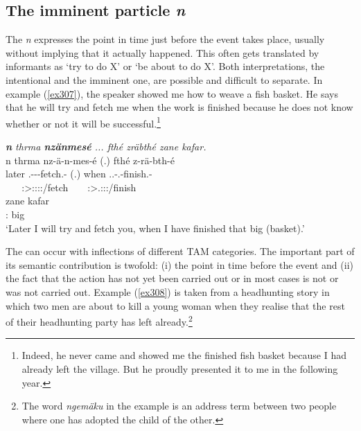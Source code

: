 \subsection{The imminent particle \emph{n}}\label{imminentm}

The   \emph{n} expresses the point in time just before the event takes place, usually without implying that it actually happened. This often gets translated by informants as `try to do X' or `be about to do X'. Both interpretations, the intentional and the imminent one, are possible and difficult to separate. In example (\ref{ex307}), the speaker showed me how to weave a fish basket. He says that he will try and fetch me when the work is finished because he does not know whether or not it will be successful.\footnote{Indeed, he never came and showed me the finished fish basket because I had already left the village. But he proudly presented it to me in the following year.}

\begin{exe}
	\ex \emph{\textbf{n} thrma \textbf{nzänmesé} ... fthé zräbthé zane kafar.}\\
	\glll n thrma nz-ä-n-mes-é (.) fthé z-rä-bth-é \\
	{\Imn} later \Ssg.\Bet-\Ndu-\Venit-fetch.\Rs-\Fsg{} (.) when \Tsg.\F.\Bet-\Irr.\Ndu-finish.\Rs-\Fsg{}\\
	~ ~ {\footnotesize \Fsg:\Sbj>\Ssg:\Obj:\Irr:\Pfv:\Venit/fetch} ~ ~ {\footnotesize \Fsg:\Sbj>\Tsg.\F:\Obj:\Irr:\Pfv/finish}\\
	\sn
	\gll zane kafar\\
	\Dem:{\Prox} big\\
	\trans `Later I will try and fetch you, when I have finished that big (basket).'\\ 
	\label{ex307}
\end{exe}

The   can occur with inflections of different TAM categories. The important part of its semantic contribution is twofold: (i) the point in time before the event and (ii) the fact that the action has not yet been carried out or \textendash{} in most cases \textendash{} is not or was not carried out. Example (\ref{ex308}) is taken from a headhunting story in which two men are about to kill a young woman when they realise that the rest of their headhunting party has left already.\footnote{The word \emph{ngemäku} in the example is an address term between two people where one has adopted the child of the other.}

